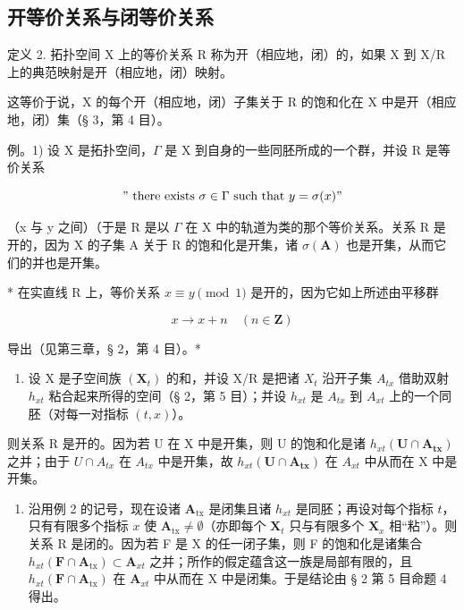 \subsection{开等价关系与闭等价关系}

定义 2. 拓扑空间 X 上的等价关系 R 称为开（相应地，闭）的，如果 X 到 X/R 上的典范映射是开（相应地，闭）映射。

这等价于说，X 的每个开（相应地，闭）子集关于 R 的饱和化在 X 中是开（相应地，闭）集（§ 3，第 4 目）。

例。1) 设 X 是拓扑空间，\(\Gamma\) 是 X 到自身的一些同胚所成的一个群，并设 R 是等价关系

\[
" \text { there   exists } \sigma \in \Gamma \text { such   that } y = \sigma (x)"
\]

（x 与 y 之间）（于是 R 是以 \(\Gamma\) 在 X 中的轨道为类的那个等价关系。关系 R 是开的，因为 X 的子集 A 关于 R 的饱和化是开集，诸 \(\sigma(\mathbf{A})\) 也是开集，从而它们的并也是开集。

* 在实直线 R 上，等价关系 \(x \equiv y \pmod{1}\) 是开的，因为它如上所述由平移群

\[
x \rightarrow x + n \quad (n \in \mathbf {Z})
\]

导出（见第三章，§ 2，第 4 目）。*

\begin{enumerate}
\def\labelenumi{\arabic{enumi})}
\setcounter{enumi}{1}
\tightlist
\item
  设 X 是子空间族 \((\mathbf{X}_{t})\) 的和，并设 X/R 是把诸 \(X_{t}\) 沿开子集 \(A_{tx}\) 借助双射 \(h_{xt}\) 粘合起来所得的空间（§ 2，第 5 目）；并设 \(h_{xt}\) 是 \(A_{tx}\) 到 \(A_{xt}\) 上的一个同胚（对每一对指标 \((t, x)\)）。
\end{enumerate}

则关系 R 是开的。因为若 U 在 X 中是开集，则 U 的饱和化是诸 \(h_{xt}(\mathbf{U} \cap \mathbf{A}_{\mathbf{tx}})\) 之并；由于 \(U \cap A_{tx}\) 在 \(A_{tx}\) 中是开集，故 \(h_{xt}(\mathbf{U} \cap \mathbf{A}_{\mathbf{tx}})\) 在 \(A_{xt}\) 中从而在 X 中是开集。

\begin{enumerate}
\def\labelenumi{\arabic{enumi})}
\setcounter{enumi}{2}
\tightlist
\item
  沿用例 2 的记号，现在设诸 \(\mathbf{A}_{\mathrm{tx}}\) 是闭集且诸 \(h_{xt}\) 是同胚；再设对每个指标 \(t\)，只有有限多个指标 \(x\) 使 \(\mathbf{A}_{\mathrm{tx}} \neq \emptyset\)（亦即每个 \(\mathbf{X}_t\) 只与有限多个 \(\mathbf{X}_x\) 相“粘”）。则关系 R 是闭的。因为若 F 是 X 的任一闭子集，则 F 的饱和化是诸集合 \(h_{xt}(\mathbf{F} \cap \mathbf{A}_{\mathrm{tx}}) \subset \mathbf{A}_{xt}\) 之并；所作的假定蕴含这一族是局部有限的，且 \(h_{xt}(\mathbf{F} \cap \mathbf{A}_{\mathrm{tx}})\) 在 \(\mathbf{A}_{xt}\) 中从而在 X 中是闭集。于是结论由 § 2 第 5 目命题 4 得出。
\end{enumerate}

